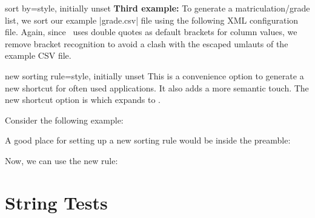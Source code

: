 \documentclass[a4paper,11pt]{ltxdoc}
\begin{document}
\begin{docCsvKey}{sort by}{=}{style, initially unset}
\clearpage\textbf{Third example:}
  To generate a matriculation/grade list, we sort our example |grade.csv| file
  using the following XML configuration file.
  Again, since \csvsorter\ uses double quotes
  as default brackets for column values, we remove bracket recognition to avoid
  a clash with the escaped umlauts of the example CSV file.\par\smallskip

\begin{dispExample}
\end{dispExample}
\end{docCsvKey}


\clearpage
\begin{docCsvKey}{new sorting rule}{=}{style, initially unset}
This is a convenience option to generate a new shortcut for often used
 applications. It also adds a more semantic touch.
The new shortcut option is
 which expands to
.\par\medskip

Consider the following example:
\begin{dispExample}
\end{dispExample}
A good place for setting up a new sorting rule would be inside the preamble:

\begin{dispListing}
\end{dispListing}

Now, we can use the new rule:
\begin{dispExample}
\end{dispExample}

\end{docCsvKey}


\clearpage
\section{String Tests}\label{sec:stringtests}%
\end{document}
